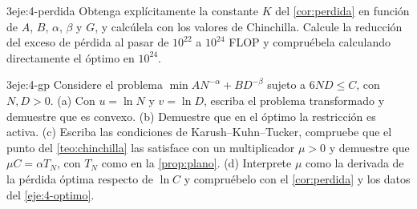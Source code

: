 \begin{ejercicio}{3}{eje:4-perdida}
Obtenga explícitamente la constante $K$ del \cref{cor:perdida} en función de $A$, $B$, $\alpha$, $\beta$ y $G$, y calcúlela con los valores de Chinchilla. Calcule la reducción del exceso de pérdida al pasar de $10^{22}$ a $10^{24}$ FLOP y compruébela calculando directamente el óptimo en $10^{24}$.
\end{ejercicio}

\begin{ejercicio}{3}{eje:4-gp}
Considere el problema $\min AN^{-\alpha}+BD^{-\beta}$ sujeto a $6ND\le C$, con $N,D>0$. (a) Con $u=\ln N$ y $v=\ln D$, escriba el problema transformado y demuestre que es convexo. (b) Demuestre que en el óptimo la restricción es activa. (c) Escriba las condiciones de Karush--Kuhn--Tucker, compruebe que el punto del \cref{teo:chinchilla} las satisface con un multiplicador $\mu>0$ y demuestre que $\mu C=\alpha T_N$, con $T_N$ como en la \cref{prop:plano}. (d) Interprete $\mu$ como la derivada de la pérdida óptima respecto de $\ln C$ y compruébelo con el \cref{cor:perdida} y los datos del \cref{eje:4-optimo}.
\end{ejercicio}

